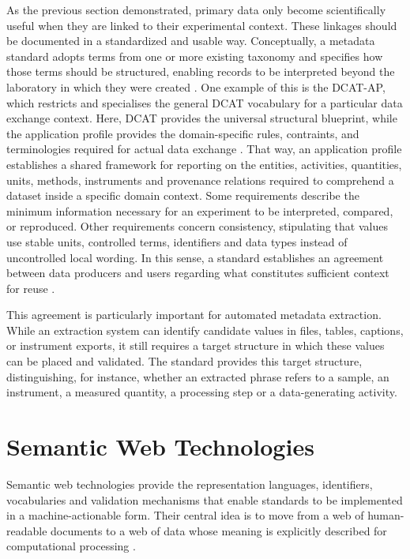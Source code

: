 As the previous section demonstrated, primary data only become scientifically useful when they are linked to their experimental context.
These linkages should be documented in a standardized and usable way.
Conceptually, a metadata standard adopts terms from one or more existing taxonomy and specifies how those terms should be structured, enabling records to be interpreted beyond the laboratory in which they were created \cite{wulf2021unified,mendes2025data}.
One example of this is the \ac{DCAT-AP}, which restricts and specialises the general \ac{DCAT} vocabulary for a particular data exchange context.
Here, \ac{DCAT} provides the universal structural blueprint, while the application profile provides the domain-specific rules, contraints, and terminologies required for actual data exchange \cite{w3c2022dcat,w3c2017shacl,stroemert2026chemdcat}.
That way, an application profile establishes a shared framework for reporting on the entities, activities, quantities, units, methods, instruments and provenance relations required to comprehend a dataset inside a specific domain context.
Some requirements describe the minimum information necessary for an experiment to be interpreted, compared, or reproduced.
Other requirements concern consistency, stipulating that values use stable units, controlled terms, identifiers and data types instead of uncontrolled local wording.
In this sense, a standard establishes an agreement between data producers and users regarding what constitutes sufficient context for reuse \cite{wulf2021unified,steinbeck2020nfdi4chem}.

This agreement is particularly important for automated metadata extraction.
While an extraction system can identify candidate values in files, tables, captions, or instrument exports, it still requires a target structure in which these values can be placed and validated.
The standard provides this target structure, distinguishing, for instance, whether an extracted phrase refers to a sample, an instrument, a measured quantity, a processing step or a data-generating activity.

\section{Semantic Web Technologies}
\label{sec:semantic-web-technologies}
Semantic web technologies provide the representation languages, identifiers, vocabularies and validation mechanisms that enable standards to be implemented in a machine-actionable form.
Their central idea is to move from a web of human-readable documents to a web of data whose meaning is explicitly described for computational processing \cite{jannidis2017digitalhumanities}.

